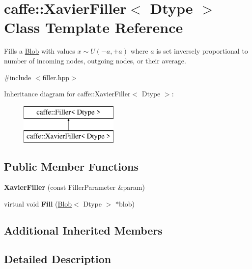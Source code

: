 \hypertarget{classcaffe_1_1XavierFiller}{}\section{caffe\+:\+:Xavier\+Filler$<$ Dtype $>$ Class Template Reference}
\label{classcaffe_1_1XavierFiller}


Fills a \hyperlink{classcaffe_1_1Blob}{Blob} with values $ x \sim U(-a, +a) $ where $ a $ is set inversely proportional to number of incoming nodes, outgoing nodes, or their average.  




{\ttfamily \#include $<$filler.\+hpp$>$}

Inheritance diagram for caffe\+:\+:Xavier\+Filler$<$ Dtype $>$\+:\begin{figure}[H]
\begin{center}
\leavevmode
\includegraphics[height=2.000000cm]{classcaffe_1_1XavierFiller}
\end{center}
\end{figure}
\subsection*{Public Member Functions}
\begin{DoxyCompactItemize}
\item 
{\bfseries Xavier\+Filler} (const Filler\+Parameter \&param)\hypertarget{classcaffe_1_1XavierFiller_a4145fb1bb9e5c543a07da69ae3b2eec6}{}\label{classcaffe_1_1XavierFiller_a4145fb1bb9e5c543a07da69ae3b2eec6}

\item 
virtual void {\bfseries Fill} (\hyperlink{classcaffe_1_1Blob}{Blob}$<$ Dtype $>$ $\ast$blob)\hypertarget{classcaffe_1_1XavierFiller_af61c37b2a24ebc70c9e7d2d3d703d2c8}{}\label{classcaffe_1_1XavierFiller_af61c37b2a24ebc70c9e7d2d3d703d2c8}

\end{DoxyCompactItemize}
\subsection*{Additional Inherited Members}


\subsection{Detailed Description}
